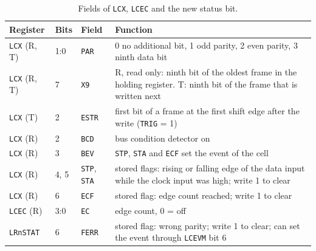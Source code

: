 \documentclass[10pt,a4paper]{article}
\newcommand{\reg}[1]{\texttt{#1}}
\begin{document}
\begin{table}[H]
\centering\small
\begin{tabularx}{\linewidth}{@{}lllL@{}}
\toprule
Register & Bits & Field & Function \\
\midrule
\reg{LCX} (R, T) & 1:0 & \reg{PAR} & 0 no additional bit, 1 odd parity, 2 even parity, 3 ninth data bit \\
\reg{LCX} (R, T) & 7 & \reg{X9} & R, read only: ninth bit of the oldest frame in the holding register. T: ninth bit of the frame that is written next \\
\reg{LCX} (T) & 2 & \reg{ESTR} & first bit of a frame at the first shift edge after the write (\reg{TRIG} = 1) \\
\reg{LCX} (R) & 2 & \reg{BCD} & bus condition detector on \\
\reg{LCX} (R) & 3 & \reg{BEV} & \reg{STP}, \reg{STA} and \reg{ECF} set the event of the cell \\
\reg{LCX} (R) & 4, 5 & \reg{STP}, \reg{STA} & stored flags: rising or falling edge of the data input while the clock input was high; write 1 to clear \\
\reg{LCX} (R) & 6 & \reg{ECF} & stored flag: edge count reached; write 1 to clear \\
\reg{LCEC} (R) & 3:0 & \reg{EC} & edge count, 0 = off \\
\reg{LRnSTAT} & 6 & \reg{FERR} & stored flag: wrong parity; write 1 to clear; can set the event through \reg{LCEVM} bit 6 \\
\bottomrule
\end{tabularx}
\caption{Fields of \reg{LCX}, \reg{LCEC} and the new status bit.}
\end{table}
\end{document}
